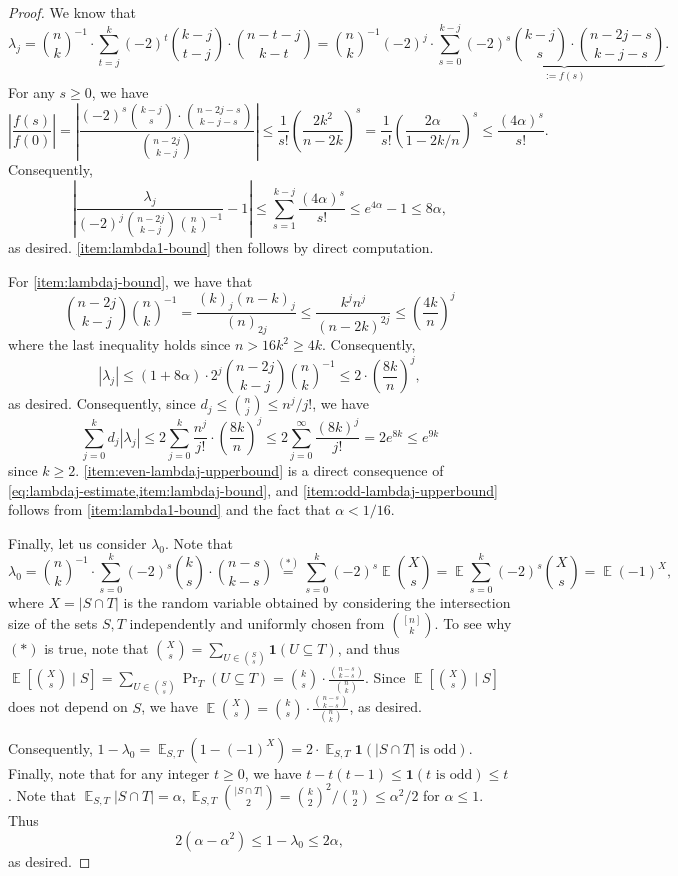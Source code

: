 \documentclass
[11pt,letterpaper]
{article}
\theoremstyle{definition}
\newcommand{\1}{\mathbf{1}}
\newcommand{\seq}{\subseteq}
\DeclareMathOperator*{\E}{\mathbb{E}}
\renewcommand{\geq}{\geqslant}
\renewcommand{\leq}{\leqslant}
\begin{document}
\begin{proof}
    We know that 
    \[\lambda_j = \binom{n}{k}^{-1}\cdot\sum_{t = j}^k(-2)^t\binom{k - j}{t - j}\cdot\binom{n - t - j}{k - t} = \binom{n}{k}^{-1}(-2)^j\cdot\sum_{s = 0}^{k - j}\underbrace{(-2)^s\binom{k - j}{s}\cdot\binom{n - 2j - s}{k - j - s}}_{:= f(s)}.\]
    For any $s \geq 0$, we have
    \[\left|\frac{f(s)}{f(0)}\right| = \left|\frac{(-2)^s\binom{k - j}{s}\cdot\binom{n - 2j - s}{k - j - s}}{\binom{n - 2j}{k - j}}\right|\leq \frac{1}{s!}\left(\frac{2k^2}{n - 2k}\right)^s = \frac{1}{s!}\left(\frac{2\alpha}{1 - 2k/n}\right)^s\leq\frac{(4\alpha)^s}{s!}.\]
    Consequently, 
    \[\left|\frac{\lambda_j}{(-2)^j\binom{n - 2j}{k - j}\binom{n}{k}^{-1}} - 1\right|\leq\sum_{s = 1}^{k - j}\frac{(4\alpha)^s}{s!}\leq e^{4\alpha} - 1\leq 8\alpha,\]
    as desired. \cref{item:lambda1-bound} then follows by direct computation.

    For \cref{item:lambdaj-bound}, we have that 
    \[\binom{n - 2j}{k - j}\binom{n}{k}^{-1} = \frac{(k)_j(n - k)_j}{(n)_{2j}}\leq\frac{k^jn^j}{(n - 2k)^{2j}}\leq\left(\frac{4k}{n}\right)^j\]
    where the last inequality holds since $n > 16k^2\geq 4k$. Consequently, 
    \[|\lambda_j|\leq (1 + 8\alpha)\cdot 2^j\binom{n - 2j}{k - j}\binom{n}{k}^{-1}\leq 2\cdot \left(\frac{8k}{n}\right)^j,\]
    as desired. Consequently, since $d_j\leq\binom{n}{j}\leq n^j/j!$, we have 
    \[\sum_{j = 0}^{k}d_j|\lambda_j|\leq 2\sum_{j = 0}^{k}\frac{n^j}{j!}\cdot\left(\frac{8k}{n}\right)^j\leq 2\sum_{j = 0}^{\infty}\frac{(8k)^j}{j!} = 2e^{8k}\leq e^{9k}\]
    since $k\geq 2$. \cref{item:even-lambdaj-upperbound} is a direct consequence of \cref{eq:lambdaj-estimate,item:lambdaj-bound}, and \cref{item:odd-lambdaj-upperbound} follows from \cref{item:lambda1-bound} and the fact that $\alpha < 1/16$.

    Finally, let us consider $\lambda_0$. Note that 
    \[\lambda_0 = \binom{n}{k}^{-1}\cdot\sum_{s = 0}^{k}(-2)^s\binom{k}{s}\cdot\binom{n - s}{k - s} \overset{(\ast)}{=} \sum_{s = 0}^{k}(-2)^s\E\binom{X}{s} = \E\sum_{s = 0}^{k}(-2)^s\binom{X}{s} = \E(-1)^X,\]
    where $X = |S\cap T|$ is the random variable obtained by considering the intersection size of the sets $S, T$ independently and uniformly chosen from $\binom{[n]}{k}$. To see why $(\ast)$ is true, note that $\binom{X}{s} = \sum_{U\in\binom{S}{s}}\1(U\seq T)$, and thus $\E\left[\binom{X}{s}\mid S\right] = \sum_{U\in\binom{S}{s}}\Pr_T(U\seq T) = \binom{k}{s}\cdot\frac{\binom{n - s}{k - s}}{\binom{n}{k}}$. Since $\E\left[\binom{X}{s}\mid S\right]$ does not depend on $S$, we have $\E\binom{X}{s} = \binom{k}{s}\cdot\frac{\binom{n - s}{k - s}}{\binom{n}{k}}$, as desired.

    Consequently, $1 - \lambda_0 = \E_{S, T}(1 - (-1)^X) = 2\cdot\E_{S, T}\1(|S\cap T|\text{ is odd})$. Finally, note that for any integer $t\geq 0$, we have $t - t(t - 1)\leq \1(t\text{ is odd})\leq t$. Note that $\E_{S, T}|S\cap T| = \alpha, \E_{S, T}\binom{|S\cap T|}{2} = \binom{k}{2}^2/\binom{n}{2}\leq\alpha^2/2$ for $\alpha\leq 1$. Thus 
    \[2(\alpha - \alpha^2)\leq 1 - \lambda_0\leq 2\alpha,\]
    as desired.
\end{proof}
\end{document}
